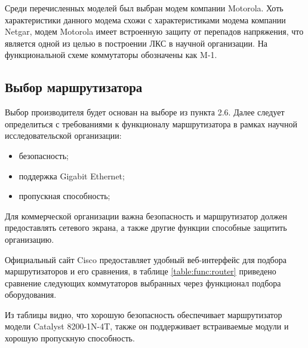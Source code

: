 Среди перечисленных моделей был выбран модем компании Motorola. Хоть характеристики данного модема схожи с характеристиками модема компании Netgar,
модем Motorola имеет встроенную защиту от перепадов напряжения\cite{motorola}, что является одной из целью в построении ЛКС в научной организации. 
На функциональной схеме коммутаторы обозначены как M-1.

\subsection{Выбор маршрутизатора}

Выбор производителя будет основан на выборе из пункта 2.6. 
Далее следует определиться с требованиями к функционалу маршрутизатора 
в рамках научной исследовательской организации:

\begin{itemize}
    \item безопасность;
    \item поддержка Gigabit Ethernet;
    \item пропускная способность;
\end{itemize}

Для коммерческой организации важна безопасность и маршрутизатор должен предоставлять сетевого экрана, а также другие функции способные защитить организацию.

Официальный сайт Cisco предоставляет удобный веб-интерфейс для подбора маршрутизаторов\cite{ciscorouter} и его сравнения, в таблице \ref{table:func:router} приведено сравнение следующих коммутаторов 
выбранных через функционал подбора оборудования.

Из таблицы видно, что хорошую безопасность обеспечивает маршрутизатор модели Catalyst 8200-1N-4T, также он поддерживает встраиваемые модули и хорошую пропускную способность.

